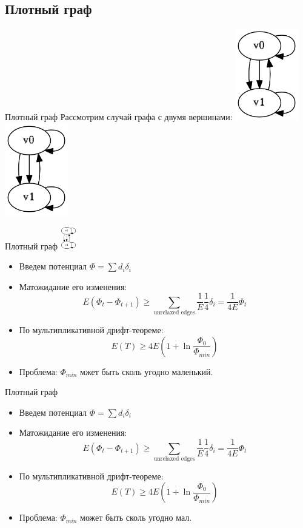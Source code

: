 \documentclass{beamer}
\begin{document}
 \subsection{Плотный граф}
 \begin{frame}{Плотный граф}
  Рассмотрим случай графа с двумя вершинами:
  \includegraphics[height=4cm]{pic/2v_graph.png}
  \includegraphics[height=4cm]{pic/2v_graph.png}
 \end{frame}
 
 \begin{frame}{Плотный граф}
  \includegraphics[height=1cm]{pic/2v_graph.png}
  \begin{itemize}
   \item Введем потенциал $\Phi = \sum d_i \delta_i$
   \item Матожидание его изменения: $$E(\Phi_t - \Phi_{t + 1}) \ge \sum_{\text{unrelaxed edges}} \frac{1}{E} \frac{1}{4} \delta_i = \frac{1}{4E} \Phi_t$$
   \item По мультипликативной дрифт-теореме: $$E(T) \ge 4E \left( 1 + \ln\frac{\Phi_0}{\Phi_{min}}\right)$$
   \item Проблема: $\Phi_{min}$ мжет быть сколь угодно маленький.
  \end{itemize}
 \end{frame}
 
  \begin{frame}{Плотный граф}
  \begin{itemize}
   \item Введем потенциал $\Phi = \sum d_i \delta_i$
   \item Матожидание его изменения: $$E(\Phi_t - \Phi_{t + 1}) \ge \sum_{\text{unrelaxed edges}} \frac{1}{E} \frac{1}{4} \delta_i = \frac{1}{4E} \Phi_t$$
   \item По мультипликативной дрифт-теореме: $$E(T) \ge 4E \left( 1 + \ln\frac{\Phi_0}{\Phi_{min}}\right)$$
   \item Проблема: $\Phi_{min}$ может быть сколь угодно мал.
  \end{itemize}
 \end{frame}
 
\end{document}

